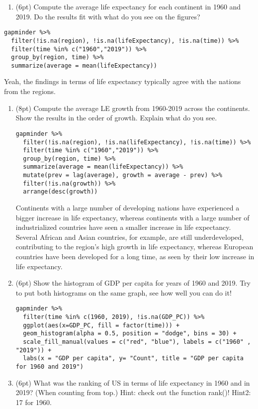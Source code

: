\documentclass[]{article}
\providecommand{\tightlist}{%
  \setlength{\itemsep}{0pt}\setlength{\parskip}{0pt}}
\begin{document}
\begin{enumerate}
\def\labelenumi{\arabic{enumi}.}
\setcounter{enumi}{3}
\tightlist
\item
  (6pt) Compute the average life expectancy for each continent in 1960
  and 2019. Do the results fit with what do you see on the figures?
\end{enumerate}

\begin{verbatim}
gapminder %>% 
  filter(!is.na(region), !is.na(lifeExpectancy), !is.na(time)) %>% 
  filter(time %in% c("1960","2019")) %>% 
  group_by(region, time) %>% 
  summarize(average = mean(lifeExpectancy))
\end{verbatim}

Yeah, the findings in terms of life expectancy typically agree with the
nations from the regions.

\begin{enumerate}
\def\labelenumi{\arabic{enumi}.}
\setcounter{enumi}{4}
\item
  (8pt) Compute the average LE growth from 1960-2019 across the
  continents. Show the results in the order of growth. Explain what do
  you see.

\begin{verbatim}
gapminder %>% 
  filter(!is.na(region), !is.na(lifeExpectancy), !is.na(time)) %>% 
  filter(time %in% c("1960","2019")) %>% 
  group_by(region, time) %>% 
  summarize(average = mean(lifeExpectancy)) %>% 
  mutate(prev = lag(average), growth = average - prev) %>% 
  filter(!is.na(growth)) %>% 
  arrange(desc(growth))
\end{verbatim}

  Continents with a large number of developing nations have experienced
  a bigger increase in life expectancy, whereas continents with a large
  number of industrialized countries have seen a smaller increase in
  life expectancy. Several African and Asian countries, for example, are
  still underdeveloped, contributing to the region's high growth in life
  expectancy, whereas European countries have been developed for a long
  time, as seen by their low increase in life expectancy.
\item
  (6pt) Show the histogram of GDP per capita for years of 1960 and 2019.
  Try to put both histograms on the same graph, see how well you can do
  it!

\begin{verbatim}
gapminder %>% 
  filter(time %in% c(1960, 2019), !is.na(GDP_PC)) %>% 
  ggplot(aes(x=GDP_PC, fill = factor(time))) +
  geom_histogram(alpha = 0.5, position = "dodge", bins = 30) +
  scale_fill_manual(values = c("red", "blue"), labels = c("1960" , "2019")) +
  labs(x = "GDP per capita", y= "Count", title = "GDP per capita for 1960 and 2019")
\end{verbatim}
\item
  (6pt) What was the ranking of US in terms of life expectancy in 1960
  and in 2019? (When counting from top.) Hint: check out the function
  rank()! Hint2: 17 for 1960.
\end{enumerate}
\end{document}
